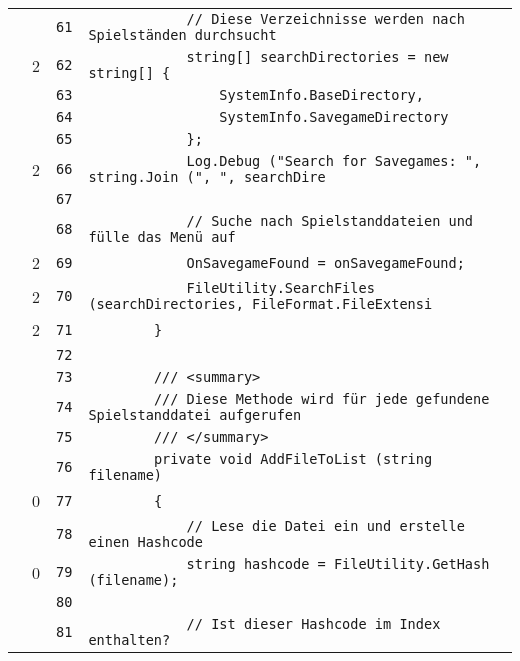 \documentclass[a4paper,10pt]{article}
\begin{document}
\begin{longtable}[l]{lrrl}
\cellcolor{gray} &  & \verb~61~ & \verb~            // Diese Verzeichnisse werden nach Spielständen durchsucht~\\
\cellcolor{green} & 2 & \verb~62~ & \verb~            string[] searchDirectories = new string[] {~\\
\cellcolor{gray} &  & \verb~63~ & \verb~                SystemInfo.BaseDirectory,~\\
\cellcolor{gray} &  & \verb~64~ & \verb~                SystemInfo.SavegameDirectory~\\
\cellcolor{gray} &  & \verb~65~ & \verb~            };~\\
\cellcolor{green} & 2 & \verb~66~ & \verb~            Log.Debug ("Search for Savegames: ", string.Join (", ", searchDire~\\
\cellcolor{gray} &  & \verb~67~ & \verb~~\\
\cellcolor{gray} &  & \verb~68~ & \verb~            // Suche nach Spielstanddateien und fülle das Menü auf~\\
\cellcolor{green} & 2 & \verb~69~ & \verb~            OnSavegameFound = onSavegameFound;~\\
\cellcolor{green} & 2 & \verb~70~ & \verb~            FileUtility.SearchFiles (searchDirectories, FileFormat.FileExtensi~\\
\cellcolor{green} & 2 & \verb~71~ & \verb~        }~\\
\cellcolor{gray} &  & \verb~72~ & \verb~~\\
\cellcolor{gray} &  & \verb~73~ & \verb~        /// <summary>~\\
\cellcolor{gray} &  & \verb~74~ & \verb~        /// Diese Methode wird für jede gefundene Spielstanddatei aufgerufen~\\
\cellcolor{gray} &  & \verb~75~ & \verb~        /// </summary>~\\
\cellcolor{gray} &  & \verb~76~ & \verb~        private void AddFileToList (string filename)~\\
\cellcolor{red} & 0 & \verb~77~ & \verb~        {~\\
\cellcolor{gray} &  & \verb~78~ & \verb~            // Lese die Datei ein und erstelle einen Hashcode~\\
\cellcolor{red} & 0 & \verb~79~ & \verb~            string hashcode = FileUtility.GetHash (filename);~\\
\cellcolor{gray} &  & \verb~80~ & \verb~~\\
\cellcolor{gray} &  & \verb~81~ & \verb~            // Ist dieser Hashcode im Index enthalten?~\\

\end{longtable}
\end{document}

